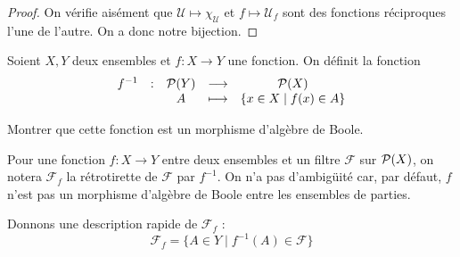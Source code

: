 \begin{proof}
  On vérifie aisément que $\mathcal U \mapsto \chi_\mathcal U$ et
  $f\mapsto \mathcal U_f$ sont des fonctions réciproques l'une de l'autre.
  On a donc notre bijection.
\end{proof}

\begin{exercise}
  Soient $X,Y$ deux ensembles et $f : X \to Y$ une fonction. On définit la
  fonction
  \[\begin{array}{ccccc}
  f^{-1} & : & \mathcal{P}(Y) & \longrightarrow & \mathcal{P}(X)\\
  & & A & \longmapsto & \{x\in X \mid f(x) \in A\}
  \end{array}\]

  Montrer que cette fonction est un morphisme d'algèbre de Boole.
\end{exercise}

\begin{notation}
  Pour une fonction $f : X \to Y$ entre deux ensembles et un filtre $\mathcal F$
  sur $\mathcal{P}(X)$, on notera $\mathcal F_f$ la rétrotirette de $\mathcal F$
  par $f^{-1}$. On n'a pas d'ambigüité car, par défaut, $f$ n'est pas un
  morphisme d'algèbre de Boole entre les ensembles de parties.

  Donnons une description rapide de $\mathcal F_f$ :
  \[\mathcal F_f = \{A \in Y \mid f^{-1}(A) \in \mathcal F\}\]
\end{notation}
